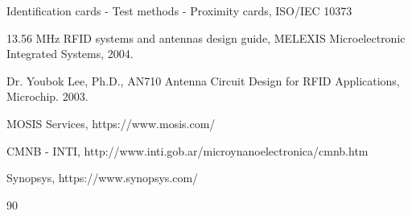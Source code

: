 \documentclass{article} %
\begin{document}
\begin{multicols}{2}
{\begin{thebibliography}{99}
	Identification cards - Test methods - Proximity cards, ISO/IEC 10373

	13.56 MHz RFID systems and antennas design guide, MELEXIS Microelectronic Integrated Systems, 2004.

	Dr. Youbok Lee, Ph.D., AN710 Antenna Circuit Design for RFID Applications, Microchip. 2003.

	MOSIS Services, https://www.mosis.com/

	CMNB - INTI, http://www.inti.gob.ar/microynanoelectronica/cmnb.htm

	Synopsys, https://www.synopsys.com/

\end{thebibliography}{90}
\noindent

} 

\end{multicols}
\end{document}
